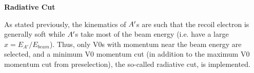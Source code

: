 
\clearpage

\textbf{Radiative Cut}


As stated previously, the kinematics of $A^\prime$s are such that the recoil electron is generally soft while $A^\prime$s take most of the beam energy (i.e. have a large $x=E_{A'}/E_{beam}$). Thus, only V0s with momentum near the beam energy are selected, and a minimum V0 momentum cut (in addition to the maximum V0 momentum cut from preselection), the so-called radiative cut, is implemented. %

